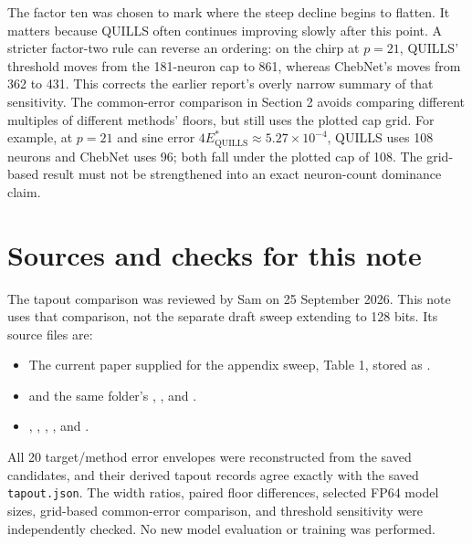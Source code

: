 \documentclass[11pt]{article}
\begin{document}
The factor ten was chosen to mark where the steep decline begins to flatten. It matters because QUILLS often continues improving slowly after this point. A stricter factor-two rule can reverse an ordering: on the chirp at \(p=21\), QUILLS' threshold moves from the 181-neuron cap to 861, whereas ChebNet's moves from 362 to 431. This corrects the earlier report's overly narrow summary of that sensitivity. The common-error comparison in Section 2 avoids comparing different multiples of different methods' floors, but still uses the plotted cap grid. For example, at \(p=21\) and sine error \(4E^*_{\mathrm{QUILLS}}\approx5.27\times10^{-4}\), QUILLS uses 108 neurons and ChebNet uses 96; both fall under the plotted cap of 108. The grid-based result must not be strengthened into an exact neuron-count dominance claim.

\section{Sources and checks for this note}
The tapout comparison was reviewed by Sam on 25 September 2026. This note uses that comparison, not the separate draft sweep extending to 128 bits. Its source files are:
\begin{itemize}\raggedright
\item The current paper supplied for the appendix sweep, Table 1, stored as .
\item {} and the same folder's , , and .
\item {}, , , , and .
\end{itemize}
All 20 target/method error envelopes were reconstructed from the saved candidates, and their derived tapout records agree exactly with the saved \texttt{tapout.json}. The width ratios, paired floor differences, selected FP64 model sizes, grid-based common-error comparison, and threshold sensitivity were independently checked. No new model evaluation or training was performed.
\end{document}
